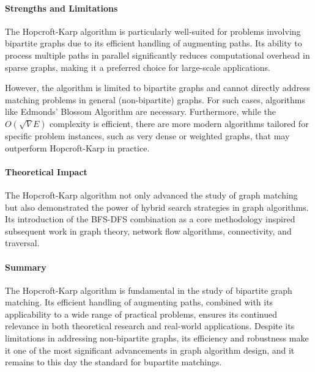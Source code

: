 \paragraph{Strengths and Limitations}
The Hopcroft-Karp algorithm is particularly well-suited for problems involving bipartite graphs due to its efficient handling of augmenting paths. Its ability to process multiple paths in parallel significantly reduces computational overhead in sparse graphs, making it a preferred choice for large-scale applications.

However, the algorithm is limited to bipartite graphs and cannot directly address matching problems in general (non-bipartite) graphs. For such cases, algorithms like Edmonds' Blossom Algorithm \cite{edmonds1965paths} are necessary. Furthermore, while the \(O(\sqrt{V}E)\) complexity is efficient, there are more modern algorithms tailored for specific problem instances, such as very dense or weighted graphs, that may outperform Hopcroft-Karp in practice.

\paragraph{Theoretical Impact}
The Hopcroft-Karp algorithm not only advanced the study of graph matching but also demonstrated the power of hybrid search strategies in graph algorithms. Its introduction of the BFS-DFS combination as a core methodology inspired subsequent work in graph theory, network flow algorithms, connectivity, and traversal.

\paragraph{Summary}
The Hopcroft-Karp algorithm is fundamental in the study of bipartite graph matching. Its efficient handling of augmenting paths, combined with its applicability to a wide range of practical problems, ensures its continued relevance in both theoretical research and real-world applications. Despite its limitations in addressing non-bipartite graphs, its efficiency and robustness make it one of the most significant advancements in graph algorithm design, and it remains to this day the standard for bupartite matchings.
